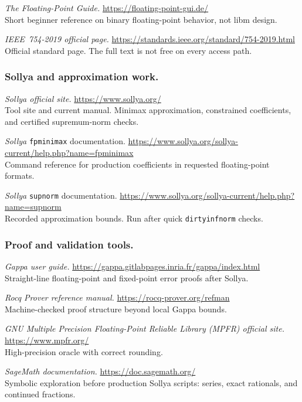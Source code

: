 \documentclass[manuscript, nonacm]{acmart}
\begin{document}
    \emph{The Floating-Point Guide.}
    \url{https://floating-point-gui.de/}\\
    Short beginner reference on binary floating-point behavior, not libm design.

    \emph{IEEE~754-2019 official page.}
    \url{https://standards.ieee.org/standard/754-2019.html}\\
    Official standard page. The full text is not free on every access path.

    \subsubsection{Sollya and approximation work.}

    \emph{Sollya official site.}
    \url{https://www.sollya.org/}\\
    Tool site and current manual. Minimax approximation, constrained
    coefficients, and certified supremum-norm checks.

    \emph{Sollya} \texttt{fpminimax} documentation.
    \url{https://www.sollya.org/sollya-current/help.php?name=fpminimax}\\
    Command reference for production coefficients in requested floating-point
    formats.

    \emph{Sollya} \texttt{supnorm} documentation.
    \url{https://www.sollya.org/sollya-current/help.php?name=supnorm}\\
    Recorded approximation bounds. Run after quick \texttt{dirtyinfnorm} checks.

    \subsubsection{Proof and validation tools.}

    \emph{Gappa user guide.}
    \url{https://gappa.gitlabpages.inria.fr/gappa/index.html}\\
    Straight-line floating-point and fixed-point error proofs after Sollya.

    \emph{Rocq Prover reference manual.}
    \url{https://rocq-prover.org/refman}\\
    Machine-checked proof structure beyond local Gappa bounds.

    \emph{GNU Multiple Precision Floating-Point Reliable Library (MPFR) official site.}
    \url{https://www.mpfr.org/}\\
    High-precision oracle with correct rounding.

    \emph{SageMath documentation.}
    \url{https://doc.sagemath.org/}\\
    Symbolic exploration before production Sollya scripts: series, exact
    rationals, and continued fractions.
\end{document}
